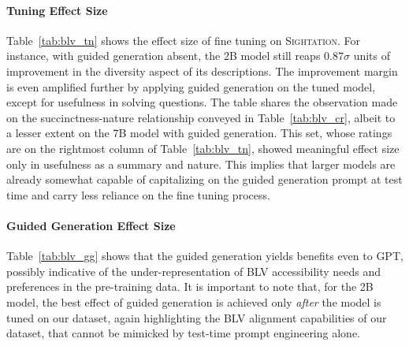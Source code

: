 \paragraph{Tuning Effect Size}
Table~\ref{tab:blv_tn} shows the effect size of fine tuning on \textsc{Sightation}. For instance, with guided generation absent, the 2B model still reaps $0.87\sigma$ units of improvement in the diversity aspect of its descriptions. The improvement margin is even amplified further by applying guided generation on the tuned model, except for usefulness in solving questions.
The table shares the observation made on the succinctness-nature relationship conveyed in Table~\ref{tab:blv_cr}, albeit to a lesser extent on the 7B model with guided generation. This set, whose ratings are on the rightmost column of Table~\ref{tab:blv_tn}, showed meaningful effect size only in usefulness as a summary and nature. This implies that larger models are already somewhat capable of capitalizing on the guided generation prompt at test time and carry less reliance on the fine tuning process.


\paragraph{Guided Generation Effect Size}
Table~\ref{tab:blv_gg} shows that the guided generation yields benefits even to GPT, possibly indicative of the under-representation of BLV accessibility needs and preferences in the pre-training data. It is important to note that, for the 2B model, the best effect of guided generation is achieved only \textit{after} the model is tuned on our dataset, again highlighting the BLV alignment capabilities of our dataset, that cannot be mimicked by test-time prompt engineering alone.
